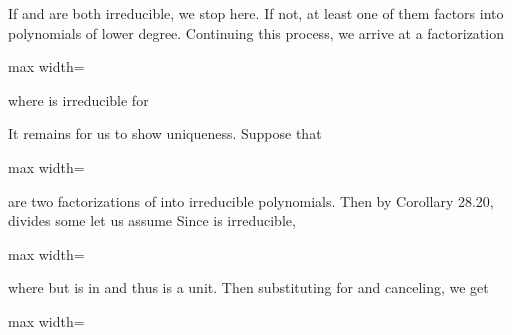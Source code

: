 \documentclass[11pt,oneside]{article}
\begin{document}
\begin{BookBody}

\noindent If  and  are both irreducible, we stop here. If not, at least one of them factors into polynomials of lower degree. Continuing this process, we arrive at a factorization

\begin{center}\begin{adjustbox}{max width=\linewidth}\end{adjustbox}\end{center}

\noindent where  is irreducible for 

It remains for us to show uniqueness. Suppose that

\begin{center}\begin{adjustbox}{max width=\linewidth}\end{adjustbox}\end{center}

\noindent are two factorizations of  into irreducible polynomials. Then by Corollary 28.20,  divides some  let us assume  Since  is irreducible,

\begin{center}\begin{adjustbox}{max width=\linewidth}\end{adjustbox}\end{center}

\noindent where  but  is in  and thus is a unit. Then substituting  for  and canceling, we get

\begin{center}\begin{adjustbox}{max width=\linewidth}\end{adjustbox}\end{center}


\end{BookBody}
\end{document}
